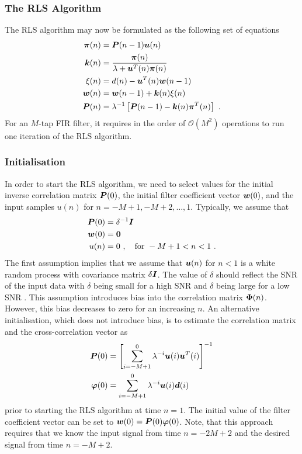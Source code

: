 \subsubsection{The RLS Algorithm}
The RLS algorithm may now be formulated as the following set of equations
\begin{align}
  \boldsymbol{\pi}(n) &= \boldsymbol{P}(n-1)\boldsymbol{u}(n)\\
  \boldsymbol{k}(n) &= \frac{\boldsymbol{\pi}(n)}{\lambda+\boldsymbol{u}^T(n)\boldsymbol{\pi}(n)}\\
  \xi(n) &= d(n)-\boldsymbol{u}^T(n)\boldsymbol{w}(n-1)\\
  \boldsymbol{w}(n) &= \boldsymbol{w}(n-1)+\boldsymbol{k}(n)\xi(n)\\
  \boldsymbol{P}(n) &= \lambda^{-1}\left[\boldsymbol{P}(n-1)-\boldsymbol{k}(n)\boldsymbol{\pi}^T(n)\right]\ .
\end{align}
For an $M$-tap FIR filter, it requires in the order of $\mathcal{O}(M^2)$ operations to run one iteration of the RLS algorithm.

\subsubsection{Initialisation}
In order to start the RLS algorithm, we need to select values for the initial inverse correlation matrix $\boldsymbol{P}(0)$, the initial filter coefficient vector $\boldsymbol{w}(0)$, and the input samples $u(n)$ for $n=-M+1,-M+2,\ldots,1$. Typically, we assume that
\begin{align}
  \boldsymbol{P}(0) &= \delta^{-1}\boldsymbol{I}\\
  \boldsymbol{w}(0) &= \boldsymbol{0}\\
  u(n) & = 0\ ,\quad\text{for } -M+1<n<1\ .
\end{align}
The first assumption implies that we assume that $\boldsymbol{u}(n)$ for $n<1$ is a white random process with covariance matrix $\delta\boldsymbol{I}$. The value of $\delta$ should reflect the SNR of the input data with $\delta$ being small for a high SNR and $\delta$ being large for a low SNR \cite[pp.~444--446]{Haykin2001}. This assumption introduces bias into the correlation matrix $\boldsymbol{\Phi}(n)$. However, this bias decreases to zero for an increasing $n$. An alternative initialisation, which does not introduce bias, is to estimate the correlation matrix and the cross-correlation vector as \cite[pp.~545--546]{Hayes1996}
\begin{align}
  \boldsymbol{P}(0) &= \left[\sum_{i=-M+1}^{0}\lambda^{-i}\boldsymbol{u}(i)\boldsymbol{u}^T(i)\right]^{-1}\\
  \boldsymbol{\varphi}(0) &= \sum_{i=-M+1}^{0}\lambda^{-i}\boldsymbol{u}(i)\boldsymbol{d}(i)
\end{align}
prior to starting the RLS algorithm at time $n=1$. The initial value of the filter coefficient vector can be set to $\boldsymbol{w}(0)=\boldsymbol{P}(0)\boldsymbol{\varphi}(0)$. Note, that this approach requires that we know the input signal from time $n=-2M+2$ and the desired signal from time $n=-M+2$. 

